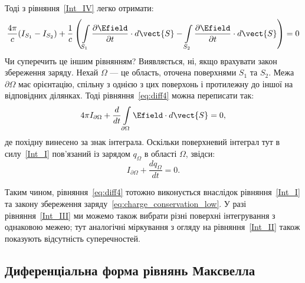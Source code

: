Тоді з рівняння~\eqref{Int_IV} легко отримати:
\begin{equation}\label{eq:diff4}
	\frac{4\pi}c(I_{S_1} - I_{S_2}) +\frac1c \left( \int\limits_{S_1}
	\frac{\partial\Efield}{\partial t}\cdot d\vect{S}  - \int\limits_{S_2}
	\frac{\partial\Efield}{\partial t}\cdot d\vect{S}  \right) = 0
\end{equation}
Чи суперечить це іншим рівнянням? Виявляється, ні, якщо врахувати закон збереження заряду. Нехай $\Omega$ --- це
область, оточена поверхнями $S_1$ та $S_2$. Межа $\partial\Omega$ має орієнтацію, спільну з однією з цих поверхонь і
протилежну до іншої на відповідних ділянках. Тоді рівняння~\eqref{eq:diff4} можна переписати так:
\begin{equation}
	4\pi I_{\partial\Omega} + \frac{d}{dt} \int\limits_{\partial\Omega} \Efield\cdot d\vect{S} = 0,
\end{equation}
де похідну винесено за знак інтеграла. Оскільки поверхневий інтеграл тут в силу~\eqref{Int_I} пов'язаний із зарядом
$q_{\Omega}$ в області $\Omega$, звідси:
\begin{equation}\label{eq:charge_conservation_low}
	I_{\partial\Omega} + \frac{dq_{\Omega}}{dt} = 0.
\end{equation}

Таким чином, рівняння~\eqref{eq:diff4} тотожно виконується внаслідок рівняння~\eqref{Int_I} та закону збереження
заряду~\eqref{eq:charge_conservation_low}. У разі рівняння~\eqref{Int_III} ми можемо також вибрати різні поверхні
інтегрування з однаковою межею; тут аналогічні міркування з огляду на рівняння~\eqref{Int_II} також показують
відсутність суперечностей.


\subsection*{Диференціальна форма рівнянь Максвелла}


